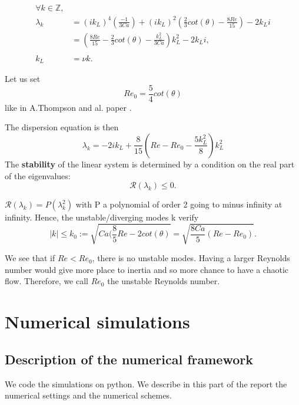 \documentclass[12pt]{article}
\begin{document}
\begin{equation*}
\begin{aligned}
    \forall k\in \mathbb{Z},\\
    \lambda_k &= (ik_L)^4(\frac{-1}{3Ca})+(ik_L)^2(\frac{2}{3}cot(\theta)-\frac{8Re}{15})-2k_Li \\
    &= (\frac{8Re}{15}-\frac{2}{3}cot(\theta) -\frac{k_L^2}{3Ca})k_L^2 - 2k_Li, \\ \\
    k_L &= \nu k.
\end{aligned}
\end{equation*}

Let us set \begin{equation}
    Re_0 = \frac{5}{4}cot(\theta)
\end{equation}
like in A.Thompson and al. paper \cite{Thompson_2016_prop_ctrl}.

The dispersion equation is then 
\begin{equation}\label{dispersion_relation}
\boxed{
    \lambda_k = -2ik_L+ \frac{8}{15}\left( Re-Re_0-\frac{5k_L^2}{8}\right)k_L^2
}
\end{equation}
The \textbf{stability} of the linear system is determined by a condition on the real part of the eigenvalues: $$\mathcal{R}(\lambda_k)\leq0.$$

$\mathcal{R}(\lambda_k) = P(\lambda_k^2)$ with P a polynomial of order 2 going to minus infinity at infinity. Hence, the unstable/diverging modes k verify 
\begin{equation}
|k|\leq k_0 := \sqrt{Ca(\frac{8}{5}Re-2cot(\theta)} = \sqrt{\frac{8Ca}{5}(Re-Re_0)}.
\end{equation}

We see that if $Re<Re_0$, there is no unstable modes. Having a larger Reynolds number would give more place to inertia and so more chance to have a chaotic flow. Therefore, we call $Re_0$ the unstable Reynolds number.

\newpage





\section{Numerical simulations}\label{Section_Numerical_simu}
\subsection{Description of the numerical framework}
We code the simulations on python. We describe in this part of the report the numerical settings and the numerical schemes.
\\
\end{document}

